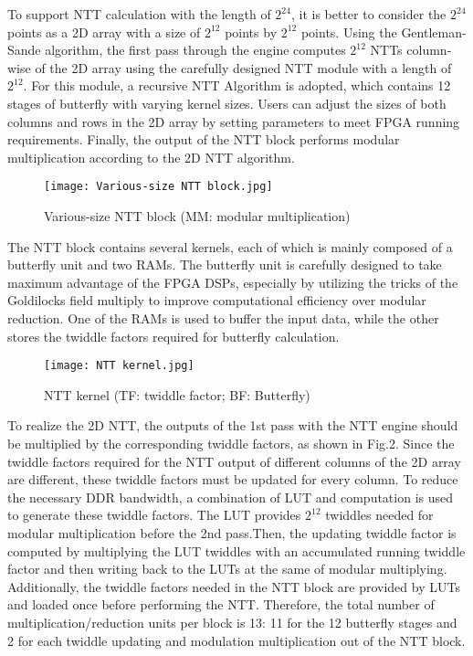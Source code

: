 To support NTT calculation with the length of $2^{24}$, it is better to consider the $2^{24}$ points as a 2D array with a size of $2^{12}$ points by $2^{12}$ points. Using the Gentleman-Sande algorithm, the first pass through the engine computes $2^{12}$ NTTs column-wise of the 2D array using the carefully designed NTT module with a length of $2^{12}$. For this module, a recursive NTT Algorithm is adopted, which contains 12 stages of butterfly with varying kernel sizes. Users can adjust the sizes of both columns and rows in the 2D array by setting parameters to meet FPGA running requirements. Finally, the output of the NTT block performs modular multiplication according to the 2D NTT algorithm.

\begin{figure}[ht]
  \centering
  \texttt{[image: Various-size NTT block.jpg]}
  \caption{Various-size NTT block (MM: modular multiplication)}
  \label{fig:NTT_module}
\end{figure}

The NTT block contains several kernels, each of which is mainly composed of a butterfly unit and two RAMs. The butterfly unit is carefully designed to take maximum advantage of the FPGA DSPs, especially by utilizing the tricks of the Goldilocks field multiply to improve computational efficiency over modular reduction. One of the RAMs is used to buffer the input data, while the other stores the twiddle factors required for butterfly calculation.


\begin{figure}[ht]
  \centering
  \texttt{[image: NTT kernel.jpg]}
  \caption{NTT kernel (TF: twiddle factor; BF: Butterfly)}
  \label{fig:NTT_kernel}
\end{figure}


To realize the 2D NTT, the outputs of the 1st pass with the NTT engine should be multiplied by the corresponding twiddle factors, as shown in Fig.2. Since the twiddle factors required for the NTT output of different columns of the 2D array are different, these twiddle factors must be updated for every column. To reduce the necessary DDR bandwidth, a combination of LUT and computation is used to generate these twiddle factors. The LUT provides  $2^{12}$ twiddles needed for modular multiplication before the 2nd pass.Then, the updating twiddle factor is computed by multiplying the LUT twiddles with an accumulated running twiddle factor and then writing back to the LUTs at the same of modular multiplying. Additionally, the twiddle factors needed in the NTT block are provided by LUTs and loaded once before performing the NTT. Therefore, the total number of multiplication/reduction units per block is 13: 11 for the 12 butterfly stages and 2 for each twiddle updating and modulation multiplication out of the NTT block.

